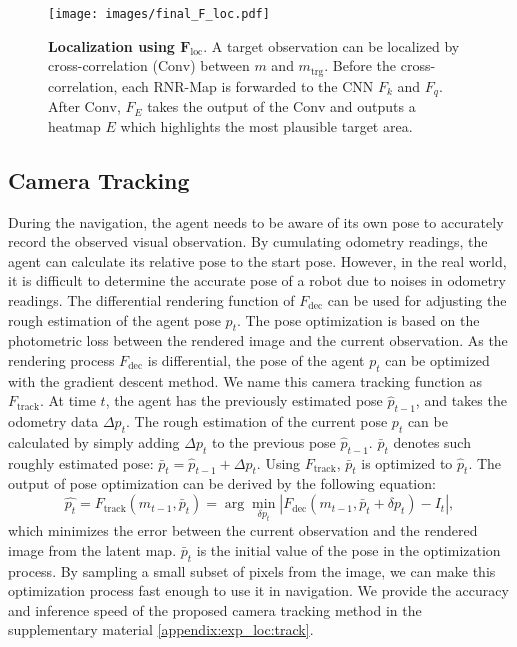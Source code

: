 \documentclass[10pt,twocolumn,letterpaper]{article}
\begin{document}
\begin{figure}[t]
  \centering
  \texttt{[image: images/final\_F\_loc.pdf]}
  
  \caption{\textbf{Localization using $\mathbf{F_\mathrm{loc}}$}. A target observation can be localized by cross-correlation ($\mathrm{Conv}$) between $m$ and $m_\mathrm{trg}$. Before the cross-correlation, each RNR-Map is forwarded to the CNN $F_k$ and $F_q$. After $\mathrm{Conv}$, $F_E$ takes the output of the $\mathrm{Conv}$ and outputs a heatmap $E$ which highlights the most plausible target area.}
  \vspace{-0.2cm}
\label{fig:loc_overview}
\end{figure}

\subsection{Camera Tracking}
%
During the navigation, the agent needs to be aware of its own pose to accurately record the observed visual observation.
%
By cumulating odometry readings, the agent can calculate its relative pose to the start pose.
%
However, in the real world, it is difficult to determine the accurate pose of a robot due to noises in odometry readings.
%
The differential rendering function of $F_\mathrm{dec}$ can be used for adjusting the rough estimation of the agent pose $p_t$.
%
The pose optimization is based on the photometric loss between the rendered image and the current observation. 
%
As the rendering process $F_\mathrm{dec}$ is differential, the pose of the agent $p_t$ can be optimized with the gradient descent method.
%
We name this camera tracking function as $F_\mathrm{track}$.
%
At time $t$, the agent has the previously estimated pose $\hat{p}_{t-1}$, and takes the odometry data $\Delta p_t$.
%
The rough estimation of the current pose $p_t$ can be calculated by simply adding $\Delta p_t$ to the previous pose $\hat{p}_{t-1}$.
%
$\bar{p}_t$ denotes such roughly estimated pose: $\bar{p}_t = \hat{p}_{t-1} + \Delta p_t $.
%
Using $F_\mathrm{track}$, $\bar{p}_t$ is optimized to $\hat{p}_t$.
%
The output of pose optimization can be derived by the following equation: 
\begin{equation} \label{eq:fine_loc}
\hat{p_t} = F_\mathrm{track}(m_{t-1}, \bar{p}_t) =  \arg\min_{\delta p_t }|F_\mathrm{dec}(m_{t-1}, \bar{p}_t + \delta p_t) - I_t|,
\end{equation}
which minimizes the error between the current observation and the rendered image from the latent map.
%
$\bar{p}_t$ is the initial value of the pose in the optimization process.
%
By sampling a small subset of pixels from the image, we can make this optimization process fast enough to use it in navigation.
%
We provide the accuracy and inference speed of the proposed camera tracking method in the supplementary material \ref{appendix:exp_loc:track}.
\end{document}
